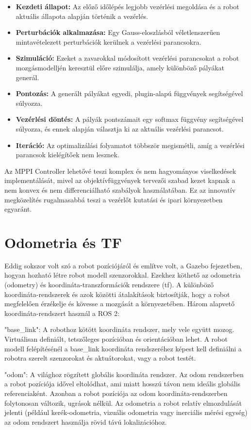 \begin{itemize}
    \item \textbf{Kezdeti állapot:} Az előző időlépés legjobb vezérlési megoldása és a robot aktuális állapota alapján történik a vezérlés.
    \item \textbf{Perturbációk alkalmazása:} Egy Gauss-eloszlásból véletlenszerűen mintavételezett perturbációk kerülnek a vezérlési parancsokra.
    \item \textbf{Szimuláció:} Ezeket a zavarokkal módosított vezérlési parancsokat a robot mozgásmodelljén keresztül előre szimulálja, amely különböző pályákat generál.
    \item \textbf{Pontozás:} A generált pályákat egyedi, plugin-alapú függvények segítségével súlyozza.
    \item \textbf{Vezérlési döntés:} A pályák pontszámait egy softmax függvény segítségével súlyozza, és ennek alapján választja ki az aktuális vezérlési parancsot.
    \item \textbf{Iteráció:} Az optimalizálási folyamatot többször megismétli, amíg a vezérlési parancsok kielégítőek nem lesznek.
\end{itemize}

Az MPPI Controller lehetővé teszi komplex és nem hagyományos viselkedések implementálását, mivel az objektívfüggvények tervezői szabad kezet kapnak a nem konvex és nem differenciálható szabályok használatában. Ez az innovatív megközelítés rugalmasabbá teszi a vezérlőt kutatási és ipari környezetben egyaránt.

\section{Odometria és TF}
Eddig sokszor volt szó a robot pozíciójáról és említve volt, a Gazebo fejezetben, hogyan hozható létre robot modell szenzorokkal. Ezekhez köthető az odometria (odometry) és koordináta-transzformációk rendszere (tf). A különböző koordináta-rendszerek és azok közötti átalakítások biztosítják, hogy a robot megfelelően érzékelje és kövesse a mozgását a környezetében. Három alapvető koordináta-rendszert használ a ROS 2:

"base\_link": A robothoz kötött koordináta rendszer, mely vele együtt mozog. Virtuálisan definiált, tetszőleges pozícióban és orientációban lehet. A robot modell felépítésénél a base\_link koordináta rendszeréhez képest kell definiálni a robotra szerelt szenzorokat és aktuátorokat, vagy a robot testét.

"odom": A világhoz rögzített globális koordináta rendszer. Az odom rendszerben a robot pozíciója idővel eltolódhat, ami miatt hosszú távon nem ideális globális referenciaként. Azonban a robot pozíciója az odom koordináta-rendszerben folytonosan változik, ugrások nélkül. Az odometria a robot relatív elmozdulását jelenti (például kerék-odometria, vizuális odometria vagy inerciális mérési egység) az odom rendszert használja rövid távú lokalizációhoz.

